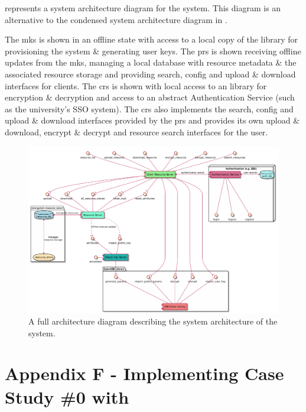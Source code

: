 \begin{appendices}
 represents a system architecture diagram for the \theResServer system. This diagram is an alternative to the condensed system architecture diagram in .

The \acrfull{mks} is shown in an offline state with access to a local copy of the \OpenABE library for provisioning the system \& generating user keys. The \acrfull{prs} is shown receiving offline updates from the \acrshort{mks}, managing a local database with resource metadata \& the associated resource storage and providing search, config and upload \& download interfaces for clients. The \acrfull{crs} is shown with local access to an \OpenABE library for encryption \& decryption and access to an abstract Authentication Service (such as the university's SSO system). The \acrshort{crs} also implements the search, config and upload \& download interfaces provided by the \acrshort{prs} and provides its own upload \& download, encrypt \& decrypt and resource search interfaces for the user.

\begin{figure}[htp]
    \centering
    \label{fig:appendix_sys_arch_full}
    \includegraphics[width=\linewidth,keepaspectratio]{appendices/diagrams/infrastructure/system_architecture.pdf}

    \caption{
      A full architecture diagram describing the system architecture of the \theResServer system.
    }

\end{figure}

\section{Appendix F - Implementing Case Study \#0 with \thePolicyLang}
\label{appendix:case_study_0_policy}


\end{appendices}
